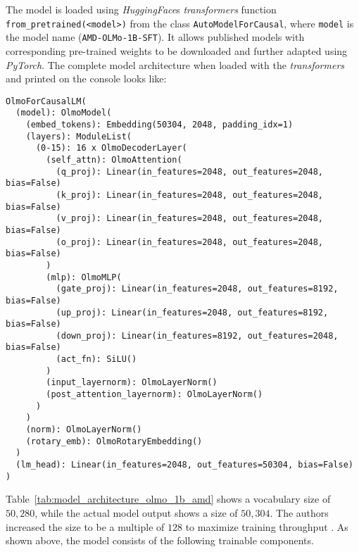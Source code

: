 The model is loaded using \emph{HuggingFace}\textquotesingle s \emph{transformers} function \texttt{from\_pretrained(\textless model\textgreater)} from the class \texttt{AutoModelForCausal}, where \texttt{model} is the model name (\texttt{AMD-OLMo-1B-SFT}). It allows published models with corresponding pre-trained weights to be downloaded and further adapted using \emph{PyTorch}. The complete model architecture when loaded with the \emph{transformers} and printed on the console looks like:
\begin{verbatim}
OlmoForCausalLM(
  (model): OlmoModel(
    (embed_tokens): Embedding(50304, 2048, padding_idx=1)
    (layers): ModuleList(
      (0-15): 16 x OlmoDecoderLayer(
        (self_attn): OlmoAttention(
          (q_proj): Linear(in_features=2048, out_features=2048, bias=False)
          (k_proj): Linear(in_features=2048, out_features=2048, bias=False)
          (v_proj): Linear(in_features=2048, out_features=2048, bias=False)
          (o_proj): Linear(in_features=2048, out_features=2048, bias=False)
        )
        (mlp): OlmoMLP(
          (gate_proj): Linear(in_features=2048, out_features=8192, bias=False)
          (up_proj): Linear(in_features=2048, out_features=8192, bias=False)
          (down_proj): Linear(in_features=8192, out_features=2048, bias=False)
          (act_fn): SiLU()
        )
        (input_layernorm): OlmoLayerNorm()
        (post_attention_layernorm): OlmoLayerNorm()
      )
    )
    (norm): OlmoLayerNorm()
    (rotary_emb): OlmoRotaryEmbedding()
  )
  (lm_head): Linear(in_features=2048, out_features=50304, bias=False)
)
\end{verbatim}
Table~\ref{tab:model_architecture_olmo_1b_amd} shows a vocabulary size of $50{,}280$, while the actual model output shows a size of $50{,}304$. The authors increased the size to be a multiple of $128$ to maximize training throughput \cite{Groeneveld2023OLMo}. As shown above, the model consists of the following trainable components.
